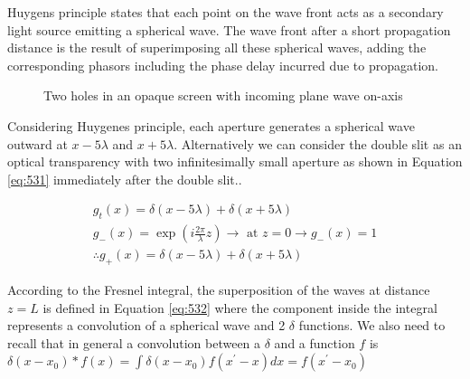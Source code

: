 \documentclass[main.tex]{subfiles}
\begin{document}
\begin{enumerate}
Huygens principle states that each point on the wave front acts as a secondary light source emitting a spherical wave. The wave front after a short propagation distance is the result of superimposing all these spherical waves, adding the corresponding phasors including the phase delay incurred due to propagation.

\begin{figure}
\centering{}
\caption{Two holes in an opaque screen with incoming plane wave on-axis}
\label{fig:53}
\end{figure}

Considering Huygenes principle, each aperture generates a spherical wave outward at $x-5\lambda$ and $x+5\lambda$. Alternatively we can consider the double slit as an optical transparency with two infinitesimally small aperture as shown in Equation \ref{eq:531} immediately after the double slit..

\begin{equation}\label{eq:531}
\begin{split}
g_t(x) = \delta(x-5\lambda) + \delta(x+5\lambda)\\
g_{-}(x) = \exp(i\frac{2\pi}{\lambda}z) \rightarrow \text{ at } z=0 \rightarrow g_{-}(x)=1\\
\therefore
g_{+}(x) = \delta(x-5\lambda) + \delta(x+5\lambda)
\end{split}
\end{equation}

According to the Fresnel integral,  the superposition of the waves at distance $z=L$ is defined in Equation \ref{eq:532} where the component inside the integral represents a convolution of a spherical wave and 2 $\delta$ functions. We also need to recall that in general a convolution between a $\delta$ and a function $f$ is $\delta(x-x_0) \ast f(x) = \int \delta(x-x_0)f(x^{\prime} -x)dx = f(x^{\prime}-x_0)$


\end{enumerate}
\end{document}
